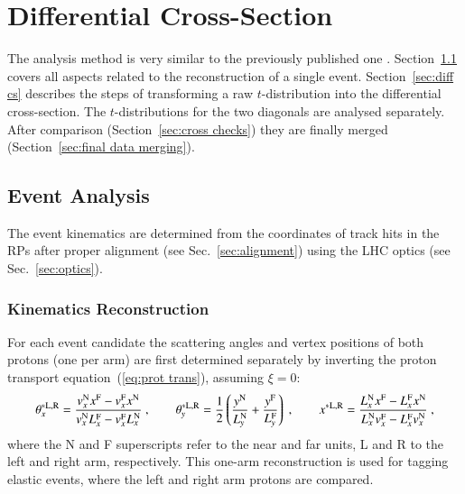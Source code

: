 \section{Differential Cross-Section}
\label{sec:differential cross-section}

The analysis method is very similar to the previously published one \cite{8tev-90m}. Section~\ref{sec:event analysis} covers all aspects related to the reconstruction of a single event. Section~\ref{sec:diff cs} describes the steps of transforming a raw $t$-distribution into the differential cross-section. The $t$-distributions for the two diagonals are analysed separately. After comparison (Section~\ref{sec:cross checks}) they are finally merged (Section~\ref{sec:final data merging}).

\subsection{Event Analysis}
\label{sec:event analysis}

The event kinematics are determined from the coordinates of track hits in the RPs after proper alignment (see Sec.~\ref{sec:alignment}) using the LHC optics (see Sec.~\ref{sec:optics}).


\subsubsection{Kinematics Reconstruction}
\label{sec:kinematics}

For each event candidate 
the scattering angles and vertex positions of both protons (one per arm) are first determined separately by inverting the proton transport equation~(\ref{eq:prot trans}), assuming $\xi = 0$:
\begin{equation}
\label{eq:kin 1a}
	\theta_x^{*\rm L,R} = {v_x^{\rm N} x^{\rm F} - v_x^{\rm F} x^{\rm N}\over v_x^{\rm N} L_x^{\rm F} - v_x^{\rm F} L_x^{\rm N}}\ ,\qquad
	\theta_y^{*\rm L,R} = {1\over 2} \left( {y^{\rm N}\over L_y^{\rm N}} + {y^{\rm F}\over L_y^{\rm F}} \right)\ ,\qquad
	x^{*\rm L,R} = {L_x^{\rm N} x^{\rm F} - L_x^{\rm F} x^{\rm N}\over L_x^{\rm N} v_x^{\rm F} - L_x^{\rm F} v_x^{\rm N}}\ , 
\end{equation}
where the N and F superscripts refer to the near and far units, L and R to the left and right arm, respectively. 
This one-arm reconstruction is used for tagging elastic events, where the left and right arm protons are compared.

